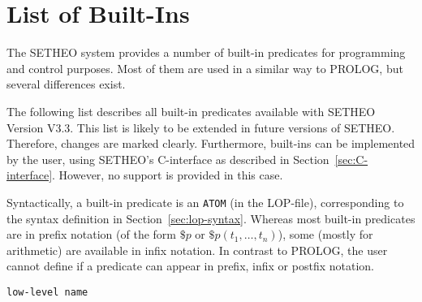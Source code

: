 %
\section{List of Built-Ins}\label{sec:builtins}

The SETHEO system provides a number of built-in predicates
for programming and control purposes.
Most of them are used in a similar way to PROLOG, but several
differences exist.

The following list describes all built-in predicates available
with SETHEO Version V3.3.
This list is likely to be extended in future versions of SETHEO.
Therefore, changes are marked clearly.
Furthermore, built-ins can be implemented by the user, using
SETHEO's C-interface as described in Section~\ref{sec:C-interface}.
However, no support is provided in this case.

Syntactically, a built-in predicate is an {\tt ATOM} 
(in the LOP-file), corresponding to the syntax definition in
Section~\ref{sec:lop-syntax}.
Whereas most built-in predicates are in prefix notation
(of the form $\$p$ or $\$p(t_1,\ldots,t_n)$), some (mostly for
arithmetic) are available in infix notation.
In contrast to PROLOG, the user cannot define if a predicate can
appear in prefix, infix or postfix notation.

%
%

{\tt low-level name}

